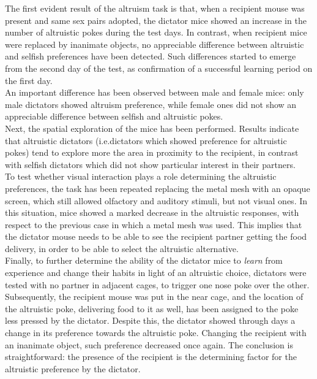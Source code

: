 \documentclass[a4paper]{article}
\begin{document}
The first evident result of the altruism task is that, when a recipient mouse was present and same sex pairs adopted, the dictator mice showed an increase in the number of altruistic pokes during the test days. In contrast, when recipient mice were replaced by inanimate objects, no appreciable difference between altruistic and selfish preferences have been detected. Such differences started to emerge from the second day of the test, as confirmation of a successful learning period on the first day. \\
An important difference has been observed between male and female mice:  only male dictators showed altruism preference, while female ones did not show an appreciable difference between selfish and altruistic pokes.\\
Next, the spatial exploration of the mice has been performed. Results indicate that altruistic dictators (i.e.dictators which showed preference for altruistic pokes) tend to explore more the area in proximity to the recipient, in contrast with selfish dictators which did not show particular interest in their partners.\\
To test whether visual interaction plays a role determining the altruistic preferences, the task has been repeated replacing the metal mesh with an opaque screen, which still allowed olfactory and auditory stimuli, but not visual ones. In this situation, mice showed a marked decrease in the altruistic responses, with respect to the previous case in which a metal mesh was used. This implies that the dictator mouse needs to be able to see the recipient partner getting the food delivery, in order to be able to select the altruistic alternative.\\
Finally, to further determine the ability of the dictator mice to \textit{learn} from experience and change their habits in light of an altruistic choice, dictators were tested with no partner in adjacent cages, to trigger one nose poke over the other. Subsequently, the recipient mouse was put in the near cage, and the location of the altruistic poke, delivering food to it as well, has been assigned to the poke less pressed by the dictator. Despite this, the dictator showed through days a change in its preference towards the altruistic poke. Changing the recipient with an inanimate object, such preference decreased once again. The conclusion is straightforward: the presence of the recipient is the determining factor for the altruistic preference by the dictator.
\\
\end{document}
